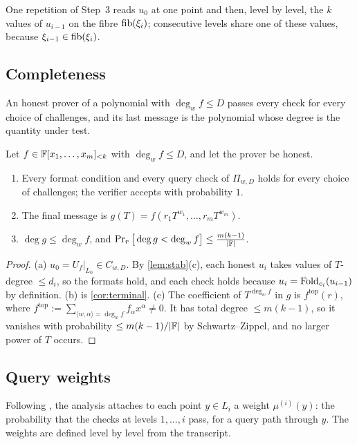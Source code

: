 One repetition of Step~3 reads $u_0$ at one point and then, level by level, the $k$ values of
$u_{i-1}$ on the fibre $\mathrm{fib}(\xi_i)$; consecutive levels share one of these values, because
$\xi_{i-1}\in\mathrm{fib}(\xi_i)$.

\subsection{Completeness}\label{sec:complete}

An honest prover of a polynomial with $\deg_wf\le D$ passes every check for every choice of
challenges, and its last message is the polynomial whose degree is the quantity under test.

\begin{proposition}\label{prop:complete}
Let $f\in\mathbb{F}[x_1,\dots,x_m]_{<k}$ with $\deg_wf\le D$, and let the prover be honest.
\begin{enumerate}
\item[(a)] Every format condition and every query check of $\Pi_{w,D}$ holds for every choice of
challenges; the verifier accepts with probability $1$.
\item[(b)] The final message is $g(T)=f(r_1T^{w_1},\dots,r_mT^{w_m})$.
\item[(c)] $\deg g\le\deg_wf$, and $\Pr_r\big[\deg g<\deg_wf\big]\le\frac{m(k-1)}{|\mathbb{F}|}$.
\end{enumerate}
\end{proposition}

\begin{proof}
(a) $u_0=U_f|_{L_0}\in C_{w,D}$. By \cref{lem:stab}(c), each honest $u_i$ takes values of
$T$-degree $\le d_i$, so the formats hold, and each check holds because
$u_i=\mathrm{Fold}_{c_i}(u_{i-1})$ by definition.
(b) is \cref{cor:terminal}.
(c) The coefficient of $T^{\deg_wf}$ in $g$ is $f^{\mathrm{top}}(r)$, where
$f^{\mathrm{top}}:=\sum_{\langle w,\alpha\rangle=\deg_wf}f_\alpha x^\alpha\ne0$. It has total
degree $\le m(k-1)$, so it vanishes with probability $\le m(k-1)/|\mathbb{F}|$ by Schwartz--Zippel, and no
larger power of $T$ occurs.
\end{proof}

\subsection{Query weights}\label{sec:weights}

Following \cite[\S8.2.1]{BCIKS20}, the analysis attaches to each point $y\in L_i$ a weight
$\mu^{(i)}(y)$: the probability that the checks at levels $1,\dots,i$ pass, for a query path
through $y$. The weights are defined level by level from the transcript.

